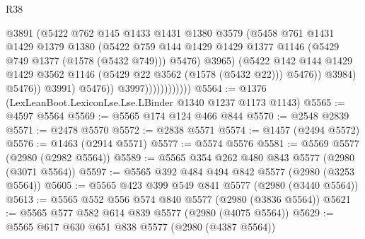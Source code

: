\begin{lexlean}{R38}
\begin{coremodule}
                                        @3891
                                        (@5422
                                          @762
                                          @145
                                          @1433
                                          @1431
                                          @1380
                                          @3579
                                          (@5458
                                            @761
                                            @1431
                                            @1429
                                            @1379
                                            @1380
                                            (@5422
                                              @759
                                              @144
                                              @1429
                                              @1429
                                              @1377
                                              @1146
                                              (@5429 @749 @1377 (@1578 (@5432 @749)))
                                              @5476)
                                            @3965)
                                          (@5422
                                            @142
                                            @144
                                            @1429
                                            @1429
                                            @3562
                                            @1146
                                            (@5429 @22 @3562 (@1578 (@5432 @22)))
                                            @5476))
                                        @3984)
                                      @5476))
                                  @3991)
                                @5476))
                            @3997))))))))))))
@5564 := @1376 (LexLeanBoot.LexiconLse.Lse.LBinder @1340 @1237 @1173 @1143)
@5565 := @4597 @5564
@5569 := @5565 @174 @124 @466 @844
@5570 := @2548 @2839
@5571 := @2478 @5570
@5572 := @2838 @5571
@5574 := @1457 (@2494 @5572)
@5576 := @1463 (@2914 @5571)
@5577 := @5574 @5576
@5581 := @5569 @5577 (@2980 (@2982 @5564))
@5589 := @5565 @354 @262 @480 @843 @5577 (@2980 (@3071 @5564))
@5597 := @5565 @392 @484 @494 @842 @5577 (@2980 (@3253 @5564))
@5605 := @5565 @423 @399 @549 @841 @5577 (@2980 (@3440 @5564))
@5613 := @5565 @552 @556 @574 @840 @5577 (@2980 (@3836 @5564))
@5621 := @5565 @577 @582 @614 @839 @5577 (@2980 (@4075 @5564))
@5629 := @5565 @617 @630 @651 @838 @5577 (@2980 (@4387 @5564))

\end{coremodule}
\end{lexlean}
